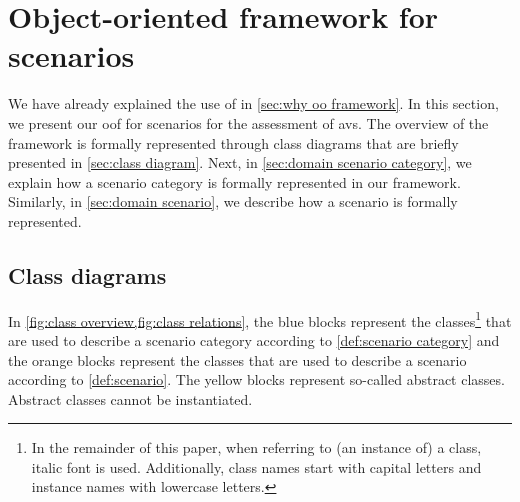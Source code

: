 \cstartb
\section{Object-oriented framework for scenarios}
\label{sec:oo framework}
\cendb

We have already explained the use of \cstartb {} \cendb in \cref{sec:why oo framework}. In this section, we present our \cstartb \ac{oof} \cendb for scenarios for the assessment of \acp{av}. 
The \cstartb overview of the framework \cendb is formally represented through \cstartb class diagrams \cendb that are briefly presented in \cref{sec:class diagram}. Next, in \cref{sec:domain scenario category}, we explain how a scenario category is formally represented \cstartb in our framework\cendb. Similarly, in \cref{sec:domain scenario}, we describe how a scenario is formally represented. 



\cstartb
\subsection{Class diagrams}\cendb
\label{sec:class diagram}

In \cref{fig:class overview,fig:class relations}, the blue blocks represent the classes\footnote{In the remainder of this paper, when referring to (an instance of) a class, italic font is used. \cstarte Additionally, class names start with capital letters and instance names with lowercase letters.\cende} that are used to describe a scenario category according to \cref{def:scenario category} and the orange blocks represent the classes that are used to describe a scenario according to \cref{def:scenario}. \cstartb The yellow blocks represent so-called abstract classes. Abstract classes cannot be instantiated. \cendb

